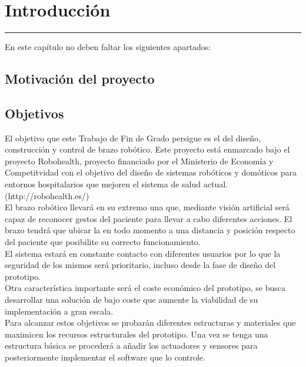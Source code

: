 \chapter{Introducción} \label{chap:Introduccion}
\hrule
\vspace{3mm}

En este capítulo no deben faltar los siguientes apartados:


\section{Motivación del proyecto}



\section{Objetivos}

El objetivo que este Trabajo de Fin de Grado persigue es el del diseño, construcción y control de brazo robótico. Este proyecto está enmarcado bajo el proyecto Robohealth, proyecto financiado por el Ministerio de Economía y Competitvidad con el objetivo del diseño de sistemas robóticos y domóticos para entornos hospitalarios que mejoren el sistema de salud actual. (\completar http://robohealth.es/)
\\ 

El brazo robótico llevará en su extremo una  que, mediante visión artificial será capaz de reconocer gestos del paciente para llevar a cabo diferentes acciones. El brazo tendrá que ubicar la  en todo momento a una distancia y posición respecto del paciente que posibilite su correcto funcionamiento.
\\ 

El sistema estará en constante contacto con diferentes usuarios por lo que la seguridad de los mismos será prioritario, incluso desde la fase de diseño del prototipo. 
\\ 

Otra característica importante será el coste económico del prototipo, se busca desarrollar una solución de bajo coste que aumente la viabilidad de su implementación a gran escala.
\\

Para alcanzar estos objetivos se probarán diferentes estructuras y materiales que maximicen los recursos estructurales del prototipo. Una vez se tenga una estructura básica se procederá a añadir los actuadores y sensores para posteriormente implementar el software que lo controle.

